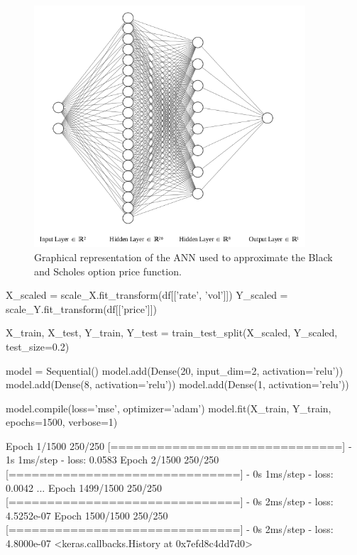 \begin{figure}[htb]
\centering
\includegraphics[width=0.9\textwidth]{figures/ann_2.png}
\caption{Graphical representation of the ANN used to approximate the Black and Scholes option price function.}
\label{fig:ann_2}
\end{figure}

\begin{ipythonnon}
X_scaled = scale_X.fit_transform(df[['rate', 'vol']])
Y_scaled = scale_Y.fit_transform(df[['price']])
	
X_train, X_test, Y_train, Y_test = train_test_split(X_scaled, 
                                                    Y_scaled, test_size=0.2)

model = Sequential()
model.add(Dense(20, input_dim=2, activation='relu'))
model.add(Dense(8, activation='relu'))
model.add(Dense(1, activation='relu'))

model.compile(loss='mse', optimizer='adam')
model.fit(X_train, Y_train, epochs=1500, verbose=1)
\end{ipythonnon}
\begin{ioutput}
Epoch 1/1500
250/250 [==============================] - 1s 1ms/step - loss: 0.0583
Epoch 2/1500
250/250 [==============================] - 0s 1ms/step - loss: 0.0042
...
Epoch 1499/1500
250/250 [==============================] - 0s 2ms/step - loss: 4.5252e-07
Epoch 1500/1500
250/250 [==============================] - 0s 2ms/step - loss: 4.8000e-07
<keras.callbacks.History at 0x7efd8c4dd7d0>
\end{ioutput}

